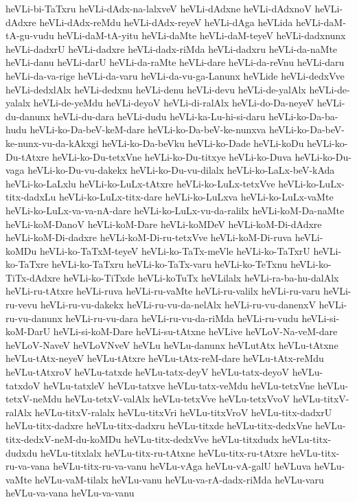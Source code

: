 {heVLi-bi-TaTxru
heVLi-dAdx-na-lalxveV
heVLi-dAdxne
heVLi-dAdxnoV
heVLi-dAdxre
heVLi-dAdx-reMdu
heVLi-dAdx-reyeV
heVLi-dAga
heVLida
heVLi-daM-tA-gu-vudu
heVLi-daM-tA-yitu
heVLi-daMte
heVLi-daM-teyeV
heVLi-dadxnunx
heVLi-dadxrU
heVLi-dadxre
heVLi-dadx-riMda
heVLi-dadxru
heVLi-da-naMte
heVLi-danu
heVLi-darU
heVLi-da-raMte
heVLi-dare
heVLi-da-reVnu
heVLi-daru
heVLi-da-va-rige
heVLi-da-varu
heVLi-da-vu-ga-Lanunx
heVLide
heVLi-dedxVve
heVLi-dedxlAlx
heVLi-dedxnu
heVLi-denu
heVLi-devu
heVLi-de-yalAlx
heVLi-de-yalalx
heVLi-de-yeMdu
heVLi-deyoV
heVLi-di-ralAlx
heVLi-do-Da-neyeV
heVLi-du-danunx
heVLi-du-dara
heVLi-dudu
heVLi-ka-Lu-hi-si-daru
heVLi-ko-Da-ba-hudu
heVLi-ko-Da-beV-keM-dare
heVLi-ko-Da-beV-ke-nunxva
heVLi-ko-Da-beV-ke-nunx-vu-da-kAkxgi
heVLi-ko-Da-beVku
heVLi-ko-Dade
heVLi-koDu
heVLi-ko-Du-tAtxre
heVLi-ko-Du-tetxVne
heVLi-ko-Du-titxye
heVLi-ko-Duva
heVLi-ko-Du-vaga
heVLi-ko-Du-vu-dakekx
heVLi-ko-Du-vu-dilalx
heVLi-ko-LaLx-beV-kAda
heVLi-ko-LaLxlu
heVLi-ko-LuLx-tAtxre
heVLi-ko-LuLx-tetxVve
heVLi-ko-LuLx-titx-dadxLu
heVLi-ko-LuLx-titx-dare
heVLi-ko-LuLxva
heVLi-ko-LuLx-vaMte
heVLi-ko-LuLx-va-va-nA-dare
heVLi-ko-LuLx-vu-da-ralilx
heVLi-koM-Da-naMte
heVLi-koM-DanoV
heVLi-koM-Dare
heVLi-koMDeV
heVLi-koM-Di-dAdxre
heVLi-koM-Di-dadxre
heVLi-koM-Di-ru-tetxVve
heVLi-koM-Di-ruva
heVLi-koMDu
heVLi-ko-TaTxM-teyeV
heVLi-ko-TaTx-meVle
heVLi-ko-TaTxrU
heVLi-ko-TaTxre
heVLi-ko-TaTxru
heVLi-ko-TaTx-varu
heVLi-ko-TeTxnu
heVLi-ko-TiTx-dAdxre
heVLi-ko-TiTxde
heVLi-koTuTx
heVLilalx
heVLi-ra-ba-hu-dalAlx
heVLi-ru-tAtxre
heVLi-ruva
heVLi-ru-vaMte
heVLi-ru-valilx
heVLi-ru-varu
heVLi-ru-vevu
heVLi-ru-vu-dakekx
heVLi-ru-vu-da-nelAlx
heVLi-ru-vu-danenxV
heVLi-ru-vu-danunx
heVLi-ru-vu-dara
heVLi-ru-vu-da-riMda
heVLi-ru-vudu
heVLi-si-koM-DarU
heVLi-si-koM-Dare
heVLi-su-tAtxne
heVLive
heVLoV-Na-veM-dare
heVLoV-NaveV
heVLoVNveV
heVLu
heVLu-danunx
heVLutAtx
heVLu-tAtxne
heVLu-tAtx-neyeV
heVLu-tAtxre
heVLu-tAtx-reM-dare
heVLu-tAtx-reMdu
heVLu-tAtxroV
heVLu-tatxde
heVLu-tatx-deyV
heVLu-tatx-deyoV
heVLu-tatxdoV
heVLu-tatxleV
heVLu-tatxve
heVLu-tatx-veMdu
heVLu-tetxVne
heVLu-tetxV-neMdu
heVLu-tetxV-valAlx
heVLu-tetxVve
heVLu-tetxVvoV
heVLu-titxV-ralAlx
heVLu-titxV-ralalx
heVLu-titxVri
heVLu-titxVroV
heVLu-titx-dadxrU
heVLu-titx-dadxre
heVLu-titx-dadxru
heVLu-titxde
heVLu-titx-dedxVne
heVLu-titx-dedxV-neM-du-koMDu
heVLu-titx-dedxVve
heVLu-titxdudx
heVLu-titx-dudxdu
heVLu-titxlalx
heVLu-titx-ru-tAtxne
heVLu-titx-ru-tAtxre
heVLu-titx-ru-va-vana
heVLu-titx-ru-va-vanu
heVLu-vAga
heVLu-vA-galU
heVLuva
heVLu-vaMte
heVLu-vaM-tilalx
heVLu-vanu
heVLu-va-rA-dadx-riMda
heVLu-varu
heVLu-va-vana
heVLu-va-vanu
}
